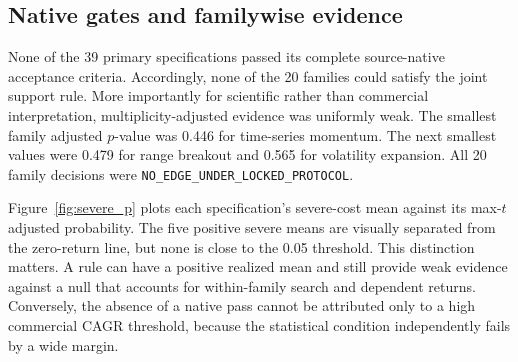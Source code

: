 \begin{table}[t]
\centering
\caption{Primary results by source block. Mean basis-point comparisons across blocks are descriptive because horizons and exposure conventions differ.}\label{tab:block_results}
\end{table}

\subsection{Native gates and familywise evidence}\label{subsec:family_results}

None of the 39 primary specifications passed its complete source-native acceptance criteria. Accordingly, none of the 20 families could satisfy the joint support rule. More importantly for scientific rather than commercial interpretation, multiplicity-adjusted evidence was uniformly weak. The smallest family adjusted $p$-value was 0.446 for time-series momentum. The next smallest values were 0.479 for range breakout and 0.565 for volatility expansion. All 20 family decisions were \texttt{NO\_EDGE\_UNDER\_LOCKED\_PROTOCOL}.

Figure~\ref{fig:severe_p} plots each specification's severe-cost mean against its max-$t$ adjusted probability. The five positive severe means are visually separated from the zero-return line, but none is close to the 0.05 threshold. This distinction matters. A rule can have a positive realized mean and still provide weak evidence against a null that accounts for within-family search and dependent returns. Conversely, the absence of a native pass cannot be attributed only to a high commercial CAGR threshold, because the statistical condition independently fails by a wide margin.

